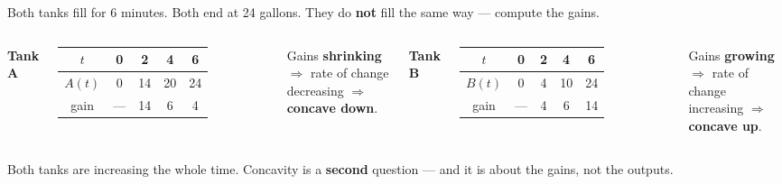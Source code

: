 \documentclass[aspectratio=169, 11pt]{beamer}
\begin{document}
\begin{frame}[t, plain]

  Both tanks fill for 6 minutes. Both end at 24 gallons. They do \textbf{not}
  fill the same way --- compute the gains.

  \medskip
  \begin{columns}[T]
      \textbf{Tank A}

      \smallskip
      \begin{tabular}{|c|c|c|c|c|}
      \hline
      \(t\) & 0 & 2 & 4 & 6 \\
      \hline
      \(A(t)\) & 0 & 14 & 20 & 24 \\
      \hline
      gain & --- & 14 & 6 & 4 \\
      \hline
      \end{tabular}

      \smallskip
      Gains \textbf{shrinking} \(\Rightarrow\) rate of change decreasing
      \(\Rightarrow\) \textbf{concave down}.

      \textbf{Tank B}

      \smallskip
      \begin{tabular}{|c|c|c|c|c|}
      \hline
      \(t\) & 0 & 2 & 4 & 6 \\
      \hline
      \(B(t)\) & 0 & 4 & 10 & 24 \\
      \hline
      gain & --- & 4 & 6 & 14 \\
      \hline
      \end{tabular}

      \smallskip
      Gains \textbf{growing} \(\Rightarrow\) rate of change increasing
      \(\Rightarrow\) \textbf{concave up}.
  \end{columns}

  \bigskip
  Both tanks are increasing the whole time. Concavity is a \textbf{second}
  question --- and it is about the gains, not the outputs.
\end{frame}
\end{document}
